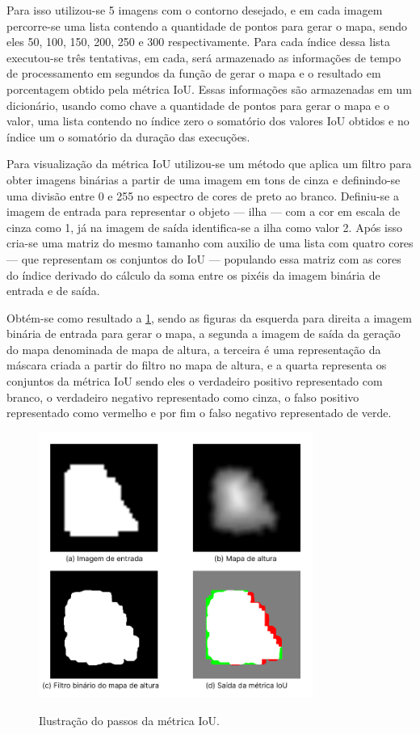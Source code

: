 Para isso utilizou-se 5 imagens com o contorno desejado, e em cada imagem percorre-se uma lista contendo a quantidade de pontos para gerar o mapa, sendo eles 50, 100, 150, 200, 250 e 300 respectivamente. Para cada índice dessa lista executou-se três tentativas, em cada, será armazenado as informações de tempo de processamento em segundos da função de gerar o mapa e o resultado em porcentagem obtido pela métrica IoU. Essas informações são armazenadas em um dicionário, usando como chave a quantidade de pontos para gerar o mapa e o valor, uma lista contendo no índice zero o somatório dos valores IoU obtidos e no índice um o somatório da duração das execuções.

Para visualização da métrica IoU utilizou-se um método que aplica um filtro para obter imagens binárias a partir de uma imagem em tons de cinza e definindo-se uma divisão entre 0 e 255 no espectro de cores de preto ao branco. Definiu-se a imagem de entrada para representar o objeto — ilha — com a cor em escala de cinza como 1, já na imagem de saída identifica-se a ilha como valor 2. Após isso cria-se uma matriz do mesmo tamanho com auxilio de uma lista com quatro cores — que representam os conjuntos do IoU — populando essa matriz com as cores do índice derivado do cálculo da soma entre os pixéis da imagem binária de entrada e de saída.

Obtém-se como resultado a \cref{fig:resultado_iou}, sendo as figuras da esquerda para direita a imagem binária de entrada para gerar o mapa, a segunda a imagem de saída da geração do mapa denominada de mapa de altura, a terceira é uma representação da máscara criada a partir do filtro no mapa de altura, e a quarta representa os conjuntos da métrica IoU sendo eles o verdadeiro positivo representado com branco, o verdadeiro negativo representado como cinza, o falso positivo representado como vermelho e por fim o falso negativo representado de verde.

\begin{figure}[!ht]
	\centering
    \caption{Ilustração do passos da métrica IoU.}
	\includegraphics[width=0.8\textwidth]{figures/passos_iou.png}
	\label{fig:resultado_iou}
\end{figure}

